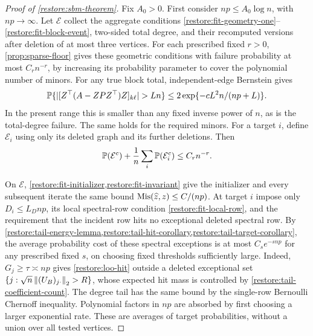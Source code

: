 \begin{proof}[Proof of \cref{restore:sbm-theorem}]
Fix $A_0>0$. First consider ${np}\le A_0\log n$, with ${np}\to\infty$.
Let $\mathcal E$ collect the aggregate conditions
\eqref{restore:fit-geometry-one}--\eqref{restore:fit-block-event},
two-sided total degree, and their recomputed versions after deletion
of at most three vertices. For each prescribed fixed $r>0$,
\cref{prop:sparse-floor} gives these geometric conditions with
failure probability at most $C_rn^{-r}$, by increasing its
probability parameter to cover the polynomial number of minors.
For any true block total, independent-edge Bernstein gives
\[
 \PP\{|[Z^\top(A-{ZPZ^\top})Z]_{k\ell}|>Ln\}
 \le2\exp\{-cL^2n/({np}+L)\}.
\]
In the present range this is smaller than any fixed inverse power
of $n$, as is the total-degree failure. The same holds for the
required minors. For a target $i$, define $\mathcal E_i$ using
only its deleted graph and its further deletions. Then
\begin{equation}\label{eq:sbm-geometry-payment}
 \mathbb P(\mathcal E^c)+\frac1n\sum_i\mathbb P(\mathcal E_i^c)
 \le C_rn^{-r}.
\end{equation}

On $\mathcal E$, \cref{restore:fit-initializer,restore:fit-invariant}
give the initializer and every subsequent iterate the same bound
$\operatorname{Mis}(\widehat z,z)\le C/(np)$. At target
$i$ impose only $D_i\le L_D{np}$, its local spectral-row condition
\eqref{restore:fit-local-row}, and the requirement that the
incident row hits no exceptional deleted spectral row. By
\cref{restore:tail-energy-lemma,restore:tail-hit-corollary,restore:tail-target-corollary},
the average probability cost of these spectral exceptions is at
most $C_se^{-s{np}}$ for any prescribed fixed $s$, on choosing fixed
thresholds sufficiently large. Indeed, $G_j\ge\tau\asymp {np}$ gives
\eqref{restore:loo-hit} outside a deleted exceptional set
$\{j:\sqrt n\left\lVert(U_B)_{j\cdot}\right\rVert_2>R\}$, whose expected hit
mass is controlled by \eqref{restore:tail-coefficient-count}.
The degree tail has the same bound by the single-row Bernoulli
Chernoff inequality. Polynomial factors in ${np}$ are absorbed by
first choosing a larger exponential rate. These are averages of
target probabilities, without a union over all tested vertices.


\end{proof}
